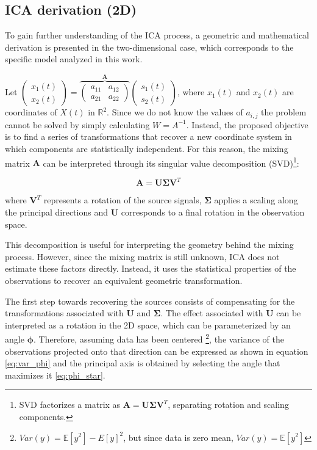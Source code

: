 \subsection{ICA derivation (2D)}


To gain further understanding of the ICA process, a geometric and mathematical derivation is presented in the two-dimensional case, which corresponds to the specific model analyzed in this work.

Let $\begin{pmatrix}
x_1(t)  \\
x_2(t)
\end{pmatrix}= 
\overbrace{
\begin{pmatrix}
a_{11} & a_{12} \\
a_{21} & a_{22}
\end{pmatrix}
}^{\mathbf{A}}
\begin{pmatrix}
s_1(t)  \\
s_2(t)
\end{pmatrix}
$, where $x_1(t)$ and $x_2(t)$ are coordinates of $X(t)$ in $\mathbb{R}^2$. Since we do not know the values of $a_{i,j}$ the problem cannot be solved by simply calculating $W=A^{-1}$. Instead, the proposed objective is to find a series of transformations that recover a new coordinate system in which components are statistically independent. For this reason, the mixing matrix $\mathbf{A}$ can be interpreted through its singular value decomposition (SVD)\footnote{SVD factorizes a matrix as $\mathbf{A} = \mathbf{U} \mathbf{\Sigma} \mathbf{V}^T$, separating rotation and scaling components.}:

\begin{equation}
    \mathbf{A} = \mathbf{U} \mathbf{\Sigma} \mathbf{V}^T
\end{equation}

\noindent where $\mathbf{V}^T$ represents a rotation of the source signals, $\mathbf{\Sigma}$ applies a scaling along the principal directions and $\mathbf{U}$ corresponds to a final rotation in the observation space.

This decomposition is useful for interpreting the geometry behind the mixing process. However, since the mixing matrix is still unknown, ICA does not estimate these factors directly. Instead, it uses the statistical properties of the observations to recover an equivalent geometric transformation.

The first step towards recovering the sources consists of compensating for the transformations associated with $\textbf{U}$ and $\mathbf{\Sigma}$. %
The effect associated with \textbf{U} can be interpreted as a rotation in the 2D space, which can be parameterized by an angle $\mathbf{\phi}$. Therefore, assuming data has been centered \footnote{$Var(y)=\mathbb{E}[y^2]-E[y]^2$, but since data is zero mean, $Var(y)=\mathbb{E}[y^2]$}, the variance of the observations projected onto that direction can be expressed as shown in equation \eqref{eq:var_phi} and the principal axis is obtained by selecting the angle that maximizes it \eqref{eq:phi_star}. 


